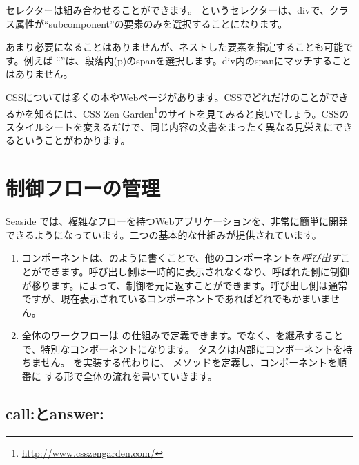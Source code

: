 \documentclass[a4paper,10pt,twoside]{book}
\begin{document}

セレクターは組み合わせることができます。  というセレクターは、divで、クラス属性が``subcomponent''の要素のみを選択することになります。

あまり必要になることはありませんが、ネストした要素を指定することも可能です。例えば ``''は、段落内(p)のspanを選択します。div内のspanにマッチすることはありません。

CSSについては多くの本やWebページがあります。CSSでどれだけのことができるかを知るには、CSS Zen Garden\footnote{\url{http://www.csszengarden.com/}}のサイトを見てみると良いでしょう。CSSのスタイルシートを変えるだけで、同じ内容の文書をまったく異なる見栄えにできるということがわかります。

\section{制御フローの管理}

Seaside では、複雑なフローを持つWebアプリケーションを、非常に簡単に開発できるようになっています。二つの基本的な仕組みが提供されています。

\begin{enumerate}
  \item コンポーネントは、のように書くことで、他のコンポーネントを\emph{呼び出す}ことができます。呼び出し側は一時的に表示されなくなり、呼ばれた側に制御が移ります。によって、制御を元に返すことができます。呼び出し側は通常 ですが、現在表示されているコンポーネントであればどれでもかまいません。

  \item 全体のワークフローは の仕組みで定義できます。でなく、を継承することで、特別なコンポーネントになります。  タスクは内部にコンポーネントを持ちません。
   を実装する代わりに、  メソッドを定義し、コンポーネントを順番に する形で全体の流れを書いていきます。
  
\end{enumerate}

\subsection{call:とanswer:}
\end{document}
